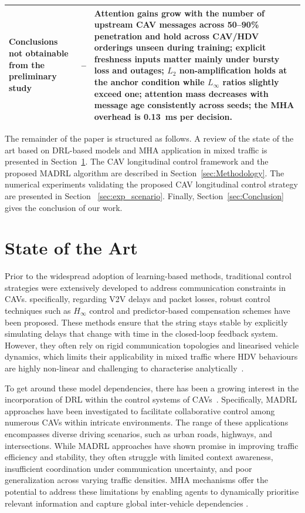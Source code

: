 \documentclass{ieeeaccess}
\begin{document}
\begin{table}[htbp]
\begin{tabularx}{\textwidth}{|p{3.1cm}|X|X|}
Conclusions not obtainable from the preliminary study & -- & Attention gains grow with the number of upstream CAV messages across 50--90\% penetration and hold across CAV/HDV orderings unseen during training; explicit freshness inputs matter mainly under bursty loss and outages; $L_2$ non-amplification holds at the anchor condition while $L_\infty$ ratios slightly exceed one; attention mass decreases with message age consistently across seeds; the MHA overhead is 0.13~ms per decision. \\ \hline %
\end{tabularx}
\end{table}



The remainder of the paper is structured as follows. A review of the state of the art based on DRL-based models and MHA application in mixed traffic is presented in Section~\ref{sec:STA}. The CAV longitudinal control framework and the proposed MADRL algorithm are described in Section~\ref{sec:Methodology}. The numerical experiments validating the proposed CAV longitudinal control strategy are presented in Section ~\ref{sec:exp_scenario}. Finally, Section~\ref{sec:Conclusion} gives the conclusion of our work.

\section{State of the Art}
\label{sec:STA}

Prior to the widespread adoption of learning-based methods, traditional control strategies were extensively developed to address communication constraints in CAVs. specifically, regarding V2V delays and packet losses, robust control techniques such as $H_\infty$ control \cite{YANG2025103212} and predictor-based compensation schemes \cite{WEI201796} have been proposed. These methods ensure that the string stays stable by explicitly simulating delays that change with time in the closed-loop feedback system. However, they often rely on rigid communication topologies and linearised vehicle dynamics, which limits their applicability in mixed traffic where HDV behaviours are highly non-linear and challenging to characterise analytically~\cite{findeisen2002introduction, Li2019}.

To get around these model dependencies, there has been a growing interest in the incorporation of DRL within the control systems of CAVs~\cite{Kiran2022_Survey, 11152633}.  Specifically, MADRL approaches have been investigated to facilitate collaborative control among numerous CAVs within intricate environments. The range of these applications encompasses diverse driving scenarios, such as urban roads, highways, and intersections.  While MADRL approaches have shown promise in improving traffic efficiency and stability, they often struggle with limited context awareness, insufficient coordination under communication uncertainty, and poor generalization across varying traffic densities. MHA mechanisms offer the potential to address these limitations by enabling agents to dynamically prioritise relevant information and capture global inter-vehicle dependencies \cite{wang2024hypergraph}.
\end{document}

